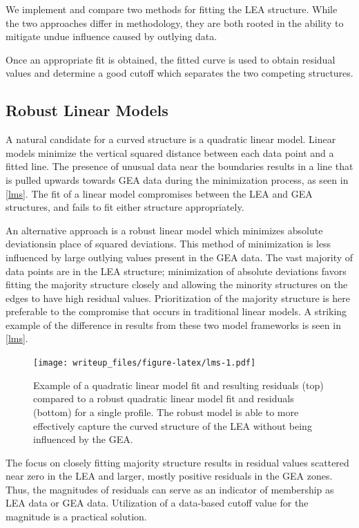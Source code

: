 \documentclass[]{article}
\begin{document}
We implement and compare two methods for fitting the LEA structure.
While the two approaches differ in methodology, they are both rooted in
the ability to mitigate undue influence caused by outlying data.

Once an appropriate fit is obtained, the fitted curve is used to obtain
residual values and determine a good cutoff which separates the two
competing structures.

\subsection{Robust Linear Models}

A natural candidate for a curved structure is a quadratic linear model.
Linear models minimize the vertical squared distance between each data
point and a fitted line. The presence of unusual data near the
boundaries results in a line that is pulled upwards towards GEA data
during the minimization process, as seen in \autoref{lms}. The fit of a
linear model compromises between the LEA and GEA structures, and fails
to fit either structure appropriately.

An alternative approach is a robust linear model which minimizes
absolute deviationsin place of squared deviations. This method of
minimization is less influenced by large outlying values present in the
GEA data. The vast majority of data points are in the LEA structure;
minimization of absolute deviations favors fitting the majority
structure closely and allowing the minority structures on the edges to
have high residual values. Prioritization of the majority structure is
here preferable to the compromise that occurs in traditional linear
models. A striking example of the difference in results from these two
model frameworks is seen in \autoref{lms}.

\begin{figure}
\centering
\texttt{[image: writeup\_files/figure-latex/lms-1.pdf]}
\caption{\label{lms}Example of a quadratic linear model fit and
resulting residuals (top) compared to a robust quadratic linear model
fit and residuals (bottom) for a single profile. The robust model is
able to more effectively capture the curved structure of the LEA without
being influenced by the GEA.}
\end{figure}

The focus on closely fitting majority structure results in residual
values scattered near zero in the LEA and larger, mostly positive
residuals in the GEA zones. Thus, the magnitudes of residuals can serve
as an indicator of membership as LEA data or GEA data. Utilization of a
data-based cutoff value for the magnitude is a practical solution.
\end{document}
